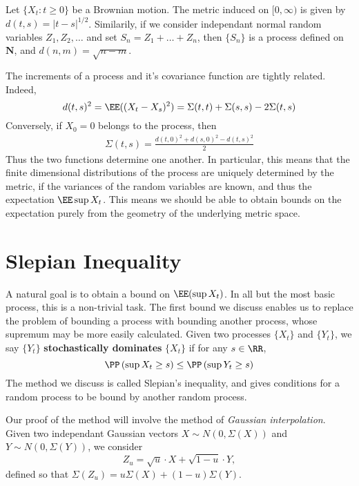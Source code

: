 \begin{example}
    Let $\{ X_t : t \geq 0 \}$ be a Brownian motion. The metric induced on $[0,\infty)$ is given by $d(t,s) = |t-s|^{1/2}$. Similarily, if we consider independant normal random variables $Z_1, Z_2, \dots$ and set $S_n = Z_1 + \dots + Z_n$, then $\{ S_n \}$ is a process defined on $\mathbf{N}$, and $d(n,m) = \sqrt{n-m}$.
\end{example}

The increments of a process and it's covariance function are tightly related. Indeed,
%
\[ d(t,s)^2 = \EE((X_t - X_s)^2) = \Sigma(t,t) + \Sigma(s,s) - 2 \Sigma(t,s) \]
%
Conversely, if $X_0 = 0$ belongs to the process, then
%
\begin{align*}
    \Sigma(t,s) = \frac{d(t,0)^2 + d(s,0)^2 - d(t,s)^2}{2}
\end{align*}
%
Thus the two functions determine one another. In particular, this means that the finite dimensional distributions of the process are uniquely determined by the metric, if the variances of the random variables are known, and thus the expectation $\EE \sup X_t$. This means we should be able to obtain bounds on the expectation purely from the geometry of the underlying metric space.

\section{Slepian Inequality}

A natural goal is to obtain a bound on $\EE(\sup X_t)$. In all but the most basic process, this is a non-trivial task. The first bound we discuss enables us to replace the problem of bounding a process with bounding another process, whose supremum may be more easily calculated. Given two processes $\{ X_t \}$ and $\{ Y_t \}$, we say $\{ Y_t \}$ \textbf{stochastically dominates} $\{ X_t \}$ if for any $s \in \RR$,
%
\[ \PP \left( \sup X_t \geq s \right) \leq \PP \left( \sup Y_t \geq s \right) \]
%
The method we discuss is called Slepian's inequality, and gives conditions for a random process to be bound by another random process.

Our proof of the method will involve the method of \emph{Gaussian interpolation}. Given two independant Gaussian vectors $X \sim N(0,\Sigma(X))$ and $Y \sim N(0,\Sigma(Y))$, we consider
%
\[ Z_u = \sqrt{u} \cdot X + \sqrt{1-u} \cdot Y, \]
%
defined so that $\Sigma(Z_u) = u \Sigma(X) + (1 - u) \Sigma(Y)$.

